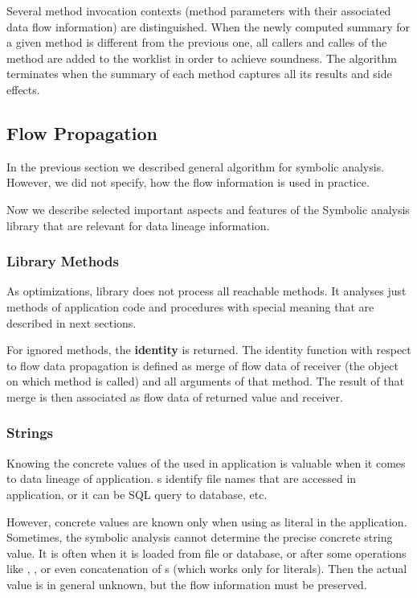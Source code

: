 Several method invocation contexts (method parameters with their associated data flow information)
are distinguished. When the newly computed summary for a given method is different from the previous
one, all callers and calles of the method are added to the worklist in order to achieve soundness.
The algorithm terminates when the summary of each method captures all its results and side effects.




\subsection{Flow Propagation}

In the previous section we described general algorithm for symbolic analysis.
However, we did not specify, how the flow information is used in practice.

Now we describe selected important aspects and features of the Symbolic analysis library
that are relevant for data lineage information.




\subsubsection{Library Methods}

As optimizations, library does not process all reachable methods.
It analyses just methods of application code and procedures with special
meaning that are described in next sections.

For ignored methods, the \textbf{identity} is returned.
The identity function with respect to flow data propagation is defined as
merge of flow data of receiver (the object on which method is called) and
all arguments of that method. The result of that merge is then associated
as flow data of returned value and receiver.




\subsubsection{Strings}

Knowing the concrete values of the  used in application is valuable
when it comes to data lineage of application.
s identify file names that are accessed in application,
or it can be SQL query to database, etc.

However, concrete values are known only when using as literal in the application.
Sometimes, the symbolic analysis cannot determine the precise concrete string value.
It is often when it is loaded from file or database, or after some operations
like , , or even concatenation of s
(which works only for  literals).
Then the actual value is in general unknown, but the flow information must be preserved.




